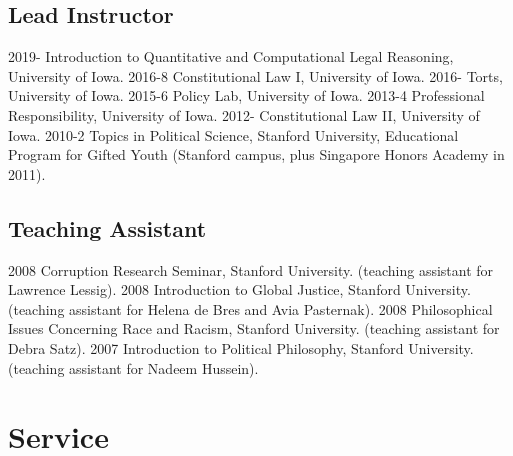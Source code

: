 \documentclass[letterpaper]{moderncv}
\begin{document}
\subsection{Lead Instructor}
\cvitem
{2019-}
{Introduction to Quantitative and Computational Legal Reasoning, University of Iowa.}
\vspace{1mm}
\cvitem
{2016-8}
{Constitutional Law I, University of Iowa.}
\vspace{1mm}
\cvitem
{2016-}
{Torts, University of Iowa.}
\vspace{1mm}
\cvitem
{2015-6}
{Policy Lab, University of Iowa.}
\vspace{1mm}
\cvitem
{2013-4}
{Professional Responsibility, University of Iowa.}
\vspace{1mm}
\cvitem
{2012-}
{Constitutional Law II, University of Iowa.}
\vspace{1mm}
\cvitem
{2010-2}
{Topics in Political Science, Stanford University, Educational Program for Gifted Youth (Stanford campus, plus Singapore Honors Academy in 2011).}
\vspace{1mm}
\subsection{Teaching Assistant}
\cvitem
{2008}
{Corruption Research Seminar, Stanford University.
  \newline
  (teaching assistant for Lawrence Lessig).
}
\vspace{1mm}
\cvitem
{2008}
{Introduction to Global Justice, Stanford University.
  \newline
  (teaching assistant for Helena de Bres and Avia Pasternak).
}
\vspace{1mm}
\cvitem
{2008}
{Philosophical Issues Concerning Race and Racism, Stanford University.
  \newline
  (teaching assistant for Debra Satz).
}
\vspace{1mm}
\cvitem
{2007}
{Introduction to Political Philosophy, Stanford University.
  \newline
  (teaching assistant for Nadeem Hussein).
}
\vspace{1mm}

\section{Service}
\end{document}
